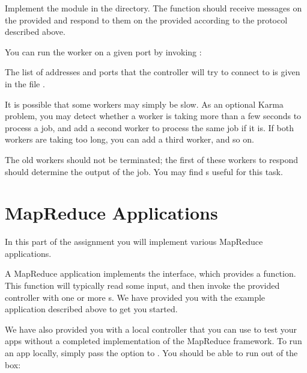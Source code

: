 \documentclass{pset}
\begin{document}
Implement the  module in the 
directory.  The  function should receive messages on the
provided  and respond to them on the provided 
according to the protocol described above.

You can run the worker on a given port by invoking :
\begin{ocaml}
\end{ocaml}

The list of addresses and ports that the controller will try to connect to is
given in the file .


It is possible that some workers may simply be slow.  As an optional Karma
problem, you may detect whether a worker is taking more than a few seconds to
process a job, and add a second worker to process the same job if it is.  If
both workers are taking too long, you can add a third worker, and so on.

The old workers should not be terminated; the first of these workers to respond
should determine the output of the job.  You may find s useful for
this task.

\newpage{}
\part{MapReduce Applications}

In this part of the assignment you will implement various MapReduce
applications.

A MapReduce application implements the  interface, which
provides a  function.  This function will typically read some input,
and then invoke the provided controller with one or more s.
We have provided you with the  example application described
above to get you started.

We have also provided you with a local controller that you can use to test your
apps without a completed implementation of the MapReduce framework.  To run an
app locally, simply pass the  option to
.  You should be able to run  out
of the box:
\begin{ocaml}
\end{ocaml}
\end{document}
